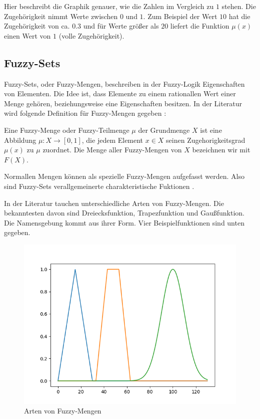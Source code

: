 Hier beschreibt die Graphik genauer, wie die Zahlen im Vergleich zu $1$ stehen. Die Zugehörigkeit nimmt Werte zwischen $0$ und $1$. Zum Beispiel der Wert $10$ hat die Zugehörigkeit von ca. $0.3$ und für Werte größer als $20$ liefert die Funktion $\mu (x)$ einen Wert von $1$ (volle Zugehörigkeit).


\subsection{Fuzzy-Sets}\label{fs_section}%
Fuzzy-Sets, oder Fuzzy-Mengen, beschreiben in der Fuzzy-Logik Eigenschaften von Elementen. Die Idee ist, dass Elemente zu einem rationallen Wert einer Menge gehören, beziehungsweise eine Eigenschaften besitzen. In der Literatur wird folgende Definition für Fuzzy-Mengen gegeben \cite{CIKruse:15}:

\begin{definition}
	Eine Fuzzy-Menge oder Fuzzy-Teilmenge $\mu$ der Grundmenge $X$ ist eine
	Abbildung $\mu : X \rightarrow [0, 1]$, die jedem Element $x \in X$ seinen Zugehorigkeitsgrad $\mu(x)$ zu
$\mu$ zuordnet. Die Menge aller Fuzzy-Mengen von $X$ bezeichnen wir mit $F(X)$. \cite{CIKruse:15}
\end{definition}

Normallen Mengen können als spezielle Fuzzy-Mengen aufgefasst werden. Also sind Fuzzy-Sets verallgemeinerte charakteristische Fuktionen \cite{CIKruse:15}.

In der Literatur tauchen unterschiedliche Arten von Fuzzy-Mengen. Die bekanntesten davon sind Dreiecksfunktion, Trapezfunktion und Gaußfunktion. Die Namensgebung kommt aus ihrer Form. Vier Beispielfunktionen sind unten gegeben.

\begin{figure}[htbp]
	\centering
	\includegraphics[scale=0.5]{images/mf_types.png}
	\caption{Arten von Fuzzy-Mengen}\label{mf_types}
\end{figure}

